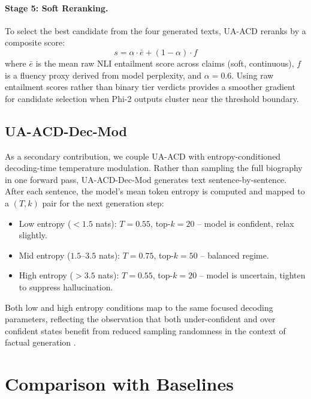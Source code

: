 \documentclass[11pt]{article}
\begin{document}
\paragraph{Stage 5: Soft Reranking.}
To select the best candidate from the four generated texts, UA-ACD reranks by a composite score:
\[
  s = \alpha \cdot \bar{e} + (1{-}\alpha) \cdot f
\]
where $\bar{e}$ is the mean raw NLI entailment score across claims (soft, continuous), $f$ is a fluency proxy derived from model perplexity, and $\alpha{=}0.6$. Using raw entailment scores rather than binary tier verdicts provides a smoother gradient for candidate selection when Phi-2 outputs cluster near the threshold boundary.

\subsection{UA-ACD-Dec-Mod}
As a secondary contribution, we couple UA-ACD with entropy-conditioned decoding-time temperature modulation. Rather than sampling the full biography in one forward pass, UA-ACD-Dec-Mod generates text sentence-by-sentence. After each sentence, the model's mean token entropy is computed and mapped to a $(T, k)$ pair for the next generation step:
\begin{itemize}
  \item Low entropy ($< 1.5$ nats): $T{=}0.55$, top-$k{=}20$ --
        model is confident, relax slightly.
  \item Mid entropy ($1.5$--$3.5$ nats): $T{=}0.75$, top-$k{=}50$
        -- balanced regime.
  \item High entropy ($> 3.5$ nats): $T{=}0.55$, top-$k{=}20$ --
        model is uncertain, tighten to suppress hallucination.
\end{itemize}
Both low and high entropy conditions map to the same focused decoding parameters, reflecting the observation that both under-confident and over confident states benefit from reduced sampling randomness in the context of factual generation \citep{lee2022factuality}.

\section{Comparison with Baselines}
\end{document}
